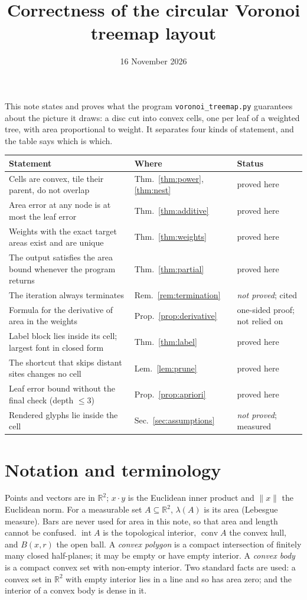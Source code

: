 \documentclass[11pt,a4paper]{article}
\title{Correctness of the circular Voronoi treemap layout}
\author{}
\date{16 November 2026}
\theoremstyle{plain}
\theoremstyle{definition}
\theoremstyle{remark}
\newcommand{\R}{\mathbb{R}}
\newcommand{\area}{\lambda}
\newcommand{\norm}[1]{\lVert #1\rVert}
\newcommand{\interior}{\operatorname{int}}
\newcommand{\conv}{\operatorname{conv}}
\begin{document}
\maketitle

\noindent
This note states and proves what the program \texttt{voronoi\_treemap.py}
guarantees about the picture it draws: a disc cut into convex cells, one per
leaf of a weighted tree, with area proportional to weight. It separates four
kinds of statement, and the table says which is which.

\begin{center}
\small\begin{tabular}{@{}p{7.6cm}p{2.3cm}p{4.6cm}@{}}
\toprule
Statement & Where & Status \\
\midrule
Cells are convex, tile their parent, do not overlap & Thm.~\ref{thm:power}, \ref{thm:nest} & proved here \\
Area error at any node is at most the leaf error & Thm.~\ref{thm:additive} & proved here \\
Weights with the exact target areas exist and are unique & Thm.~\ref{thm:weights} & proved here \\
The output satisfies the area bound whenever the program returns & Thm.~\ref{thm:partial} & proved here \\
The iteration always terminates & Rem.~\ref{rem:termination} & \emph{not proved}; cited \\
Formula for the derivative of area in the weights & Prop.~\ref{prop:derivative} & one-sided proof; not relied on \\
Label block lies inside its cell; largest font in closed form & Thm.~\ref{thm:label} & proved here \\
The shortcut that skips distant sites changes no cell & Lem.~\ref{lem:prune} & proved here \\
Leaf error bound without the final check (depth $\le 3$) & Prop.~\ref{prop:apriori} & proved here \\
Rendered glyphs lie inside the cell & Sec.~\ref{sec:assumptions} & \emph{not proved}; measured \\
\bottomrule
\end{tabular}
\end{center}

\section{Notation and terminology}

Points and vectors are in $\R^2$; $x\cdot y$ is the Euclidean inner product and
$\norm{x}$ the Euclidean norm. For a measurable set $A\subseteq\R^2$,
$\area(A)$ is its area (Lebesgue measure). Bars are never used for area in
this note, so that area and length cannot be confused. $\interior A$ is the
topological interior, $\conv A$ the convex hull, and $B(x,r)$ the open ball. A \emph{convex polygon} is a compact intersection of
finitely many closed half-planes; it may be empty or have empty interior.
A \emph{convex body} is a compact convex set with non-empty interior. Two
standard facts are used: a convex set in $\R^2$ with empty interior lies in a
line and so has area zero; and the interior of a convex body is dense in it.
\end{document}
